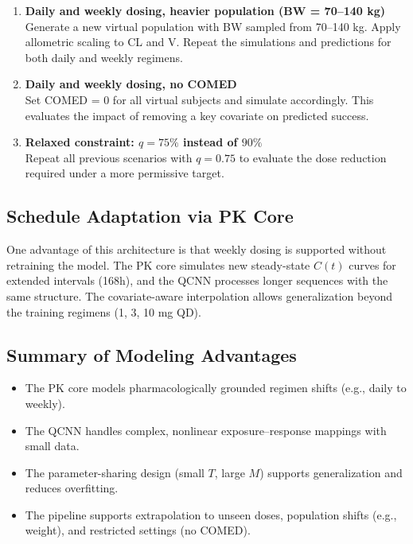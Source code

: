 \documentclass[11pt]{article}
\begin{document}
\begin{itemize}
\begin{enumerate}[label=\textbf{\arabic*.}]
  \item \textbf{Daily and weekly dosing, heavier population (BW = 70--140 kg)} \\
  Generate a new virtual population with BW sampled from 70--140 kg. Apply allometric scaling to CL and V. Repeat the simulations and predictions for both daily and weekly regimens.

  \item \textbf{Daily and weekly dosing, no COMED} \\
  Set COMED = 0 for all virtual subjects and simulate accordingly. This evaluates the impact of removing a key covariate on predicted success.

  \item \textbf{Relaxed constraint: $q = 75\%$ instead of $90\%$} \\
  Repeat all previous scenarios with $q = 0.75$ to evaluate the dose reduction required under a more permissive target.
\end{enumerate}

\subsection{Schedule Adaptation via PK Core}

One advantage of this architecture is that weekly dosing is supported without retraining the model. The PK core simulates new steady-state $C(t)$ curves for extended intervals (168h), and the QCNN processes longer sequences with the same structure. The covariate-aware interpolation allows generalization beyond the training regimens (1, 3, 10 mg QD).

\subsection{Summary of Modeling Advantages}

\begin{itemize} \item The PK core models pharmacologically grounded regimen shifts (e.g., daily to weekly). \item The QCNN handles complex, nonlinear exposure–response mappings with small data. \item The parameter-sharing design (small $T$, large $M$) supports generalization and reduces overfitting. \item The pipeline supports extrapolation to unseen doses, population shifts (e.g., weight), and restricted settings (no COMED). \end{itemize}


\end{itemize}
\end{document}
